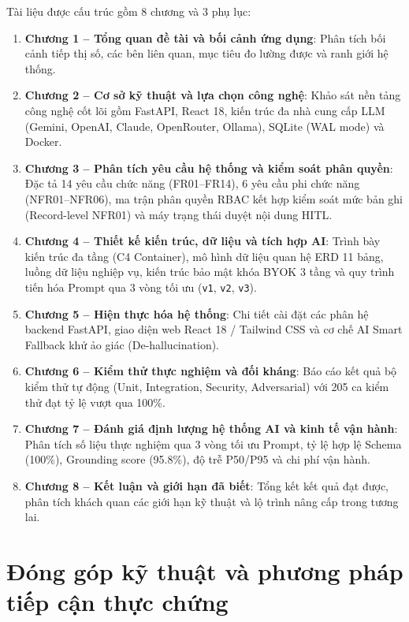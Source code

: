 Tài liệu được cấu trúc gồm 8 chương và 3 phụ lục:
\begin{enumerate}
  \item \textbf{Chương 1 -- Tổng quan đề tài và bối cảnh ứng dụng}: Phân tích bối cảnh tiếp thị số, các bên liên quan, mục tiêu đo lường được và ranh giới hệ thống.
  \item \textbf{Chương 2 -- Cơ sở kỹ thuật và lựa chọn công nghệ}: Khảo sát nền tảng công nghệ cốt lõi gồm FastAPI, React 18, kiến trúc đa nhà cung cấp LLM (Gemini, OpenAI, Claude, OpenRouter, Ollama), SQLite (WAL mode) và Docker.
  \item \textbf{Chương 3 -- Phân tích yêu cầu hệ thống và kiểm soát phân quyền}: Đặc tả 14 yêu cầu chức năng (FR01--FR14), 6 yêu cầu phi chức năng (NFR01--NFR06), ma trận phân quyền RBAC kết hợp kiểm soát mức bản ghi (Record-level NFR01) và máy trạng thái duyệt nội dung HITL.
  \item \textbf{Chương 4 -- Thiết kế kiến trúc, dữ liệu và tích hợp AI}: Trình bày kiến trúc đa tầng (C4 Container), mô hình dữ liệu quan hệ ERD 11 bảng, luồng dữ liệu nghiệp vụ, kiến trúc bảo mật khóa BYOK 3 tầng và quy trình tiến hóa Prompt qua 3 vòng tối ưu (\texttt{v1}, \texttt{v2}, \texttt{v3}).
  \item \textbf{Chương 5 -- Hiện thực hóa hệ thống}: Chi tiết cài đặt các phân hệ backend FastAPI, giao diện web React 18 / Tailwind CSS và cơ chế AI Smart Fallback khử ảo giác (De-hallucination).
  \item \textbf{Chương 6 -- Kiểm thử thực nghiệm và đối kháng}: Báo cáo kết quả bộ kiểm thử tự động (Unit, Integration, Security, Adversarial) với 205 ca kiểm thử đạt tỷ lệ vượt qua 100\%.
  \item \textbf{Chương 7 -- Đánh giá định lượng hệ thống AI và kinh tế vận hành}: Phân tích số liệu thực nghiệm qua 3 vòng tối ưu Prompt, tỷ lệ hợp lệ Schema (100\%), Grounding score (95.8\%), độ trễ P50/P95 và chi phí vận hành.
  \item \textbf{Chương 8 -- Kết luận và giới hạn đã biết}: Tổng kết kết quả đạt được, phân tích khách quan các giới hạn kỹ thuật và lộ trình nâng cấp trong tương lai.
\end{enumerate}

\section*{Đóng góp kỹ thuật và phương pháp tiếp cận thực chứng}

